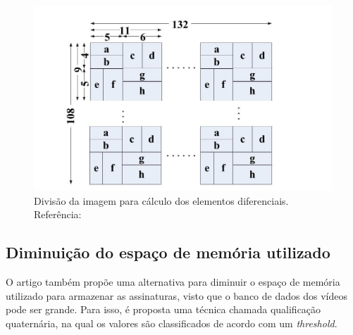 \begin{figure}[h]
	\centering
    \label{fig:divsceneframe}
	\includegraphics[width=\textwidth]{dados/figuras/divisaosceneframe.jpg}
    \caption{Divisão da imagem para cálculo dos elementos diferenciais. Referência: \citeauthor{mao2015sceneframe}}
\end{figure}

\subsection{Diminuição do espaço de memória utilizado}

O artigo também propõe uma alternativa para diminuir o espaço de memória utilizado para armazenar as assinaturas, visto que o banco de dados dos vídeos pode ser grande. Para isso, é proposta uma técnica chamada qualificação quaternária, na qual os valores são classificados de acordo com um \textit{threshold}.



